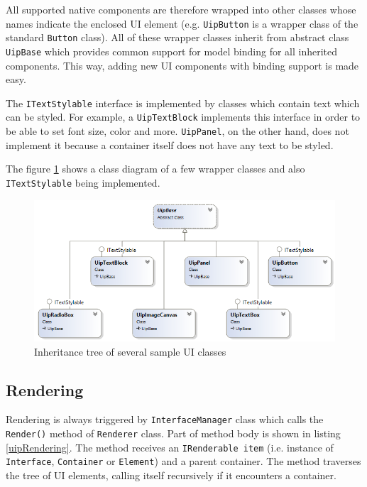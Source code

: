 All supported native components are therefore wrapped into other classes whose names indicate the enclosed UI element (e.g. \texttt{UipButton} is a wrapper class of the standard \texttt{Button} class). All of these wrapper classes inherit from abstract class \texttt{UipBase} which provides common support for model binding for all inherited components. This way, adding new UI components with binding support is made easy.

The \texttt{ITextStylable} interface is implemented by classes which contain text which can be styled. For example, a \texttt{UipTextBlock} implements this interface in order to be able to set font size, color and more. \texttt{UipPanel}, on the other hand, does not implement it because a container itself does not have any text to be styled.

The figure \ref{fig:UIclasses} shows a class diagram of a few wrapper classes and also \texttt{ITextStylable} being implemented.

\begin{figure}[ht!]
\centering
\includegraphics[width=140mm]{pics/UI_classes.png}
\caption{Inheritance tree of several sample UI classes}
\label{fig:UIclasses}
\end{figure}

\subsection{Rendering}
Rendering is always triggered by \texttt{InterfaceManager} class which calls the \texttt{Render()} method of \texttt{Renderer} class. Part of method body is shown in  listing \ref{uipRendering}. The method receives an \texttt{IRenderable item}  (i.e. instance of \texttt{Interface}, \texttt{Container} or \texttt{Element}) and a parent container. The method traverses the tree of UI elements, calling itself recursively if it encounters a container.

